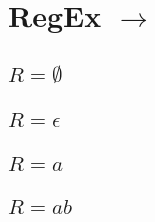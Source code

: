 \documentclass[12pt, oneside]{book}
\begin{document}
\section[RegEx zu NEA]{RegEx $\to$ \enea}
\subsection[Regulärer Ausdruck: Leere Menge]{$R = \emptyset$}
\begin{figure}[H]
    \centering
    \begin{transitiongraph}[fa]
    \end{transitiongraph}
\end{figure}
\subsection[Regulärer Ausdruck: Leeres Wort]{$R = \epsilon$}
\begin{figure}[H]
    \centering
    \begin{transitiongraph}[fa]
    \end{transitiongraph}
\end{figure}
\subsection[Regulärer Ausdruck: Eingabesymbol]{$R = a$}
\begin{figure}[H]
    \centering
    \begin{transitiongraph}[fa]
    \end{transitiongraph}
\end{figure}
\subsection[Regulärer Ausdruck: Verkettung]{$R = ab$}
\begin{figure}[H]
    \centering
    \begin{transitiongraph}[fa]
    \end{transitiongraph}
\end{figure}
\end{document}
